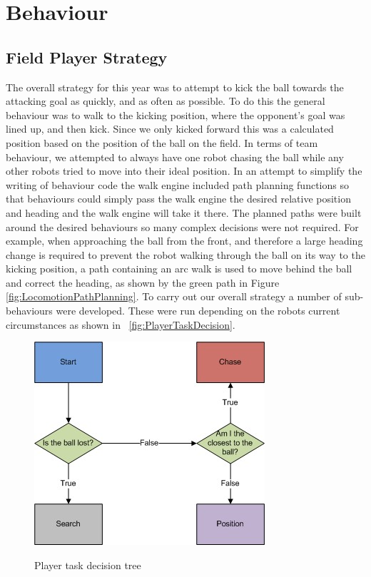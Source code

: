 \section{Behaviour}
\label{Behaviour}
\subsection{Field Player Strategy}
The overall strategy for this year was to attempt to kick the ball towards the attacking goal as quickly, and as often as possible. To do this the general behaviour was to walk to the kicking position, where the opponent's goal was lined up, and then kick. Since we only kicked forward this was a calculated position based on the position of the ball on the field. In terms of team behaviour, we attempted to always have one robot chasing the ball while any other robots tried to move into their ideal position. In an attempt to simplify the writing of behaviour code the walk engine included path planning functions so that behaviours could simply pass the walk engine the desired relative position and heading and the walk engine will take it there. The planned paths were built around the desired behaviours so many complex decisions were not required. For example, when approaching the ball from the front, and therefore a large heading change is required to prevent the robot walking through the ball on its way to the kicking position, a path containing an arc walk is used to move behind the ball and correct the heading, as shown by the green path in Figure \ref{fig:LocomotionPathPlanning}. To carry out our overall strategy a number of sub-behaviours were developed. These were run depending on the robots current circumstances as shown in ~\autoref{fig:PlayerTaskDecision}.

\begin{figure}[htpb]
\begin{center}
   \leavevmode
    \scalebox{0.8} {\includegraphics{figs/FieldPlayerTaskDecision.jpg} }
    \caption{Player task decision tree}
    \label{fig:PlayerTaskDecision}
\end{center}
\end{figure}



